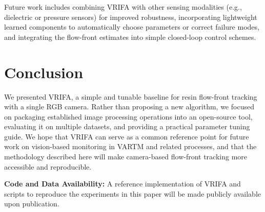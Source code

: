 \documentclass[twocolumn, 10pt]{article}
\begin{document}
Future work includes combining VRIFA with other sensing modalities (e.g., dielectric or pressure sensors) for improved robustness, incorporating lightweight learned components to automatically choose parameters or correct failure modes, and integrating the flow-front estimates into simple closed-loop control schemes.

\section{Conclusion}
\label{sec:conclusion}

We presented VRIFA, a simple and tunable baseline for resin flow-front tracking with a single RGB camera. Rather than proposing a new algorithm, we focused on packaging established image processing operations into an open-source tool, evaluating it on multiple datasets, and providing a practical parameter tuning guide. We hope that VRIFA can serve as a common reference point for future work on vision-based monitoring in VARTM and related processes, and that the methodology described here will make camera-based flow-front tracking more accessible and reproducible.

\vspace{1ex}
\noindent\textbf{Code and Data Availability:} A reference implementation of VRIFA and scripts to reproduce the experiments in this paper will be made publicly available upon publication.



\end{document}
